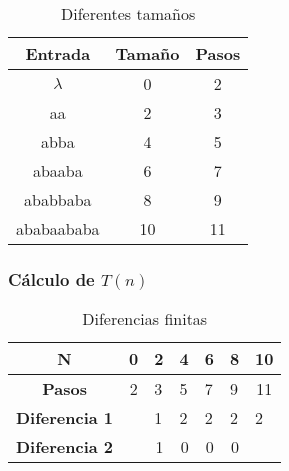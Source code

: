 \documentclass{uc3mpracticas}
\begin{document}
  \begin{table}[!h]
    \centering
  \begin{tabular}{|c|c|c|}
  \hline

  \textbf{Entrada} & \textbf{Tamaño} & \textbf{Pasos} \\ \hline

  $\lambda$           & 0               & 2              \\ \hline
  aa               & 2               & 3              \\ \hline
  abba             & 4               & 5              \\ \hline
  abaaba           & 6               & 7              \\ \hline
  ababbaba         & 8               & 9              \\ \hline
  ababaababa       & 10              & 11             \\ \hline
  \end{tabular}
  \caption{Diferentes tamaños}
  \end{table}



  \subsubsection{Cálculo de $T(n)$}

  \begin{table}[!h]
    \centering
  \begin{tabular}{|c|p{1cm}|p{1cm}|p{1cm}|p{1cm}|p{1cm}|p{1cm}|}
  \hline
  \textbf{N}     & \multicolumn{1}{c|}{\textbf{0}} & \textbf{2} & \textbf{4}             & \textbf{6}             & \textbf{8}             & \multicolumn{1}{c|}{\textbf{10}} \\ \hline
  \textbf{Pasos} & \multicolumn{1}{c|}{2}          & 3          & 5                      & 7                      & 9                      & \multicolumn{1}{c|}{11}          \\ \hline
  \textbf{Diferencia 1}                  &                                                         & \multicolumn{1}{l|}{1}             & \multicolumn{1}{l|}{2} & \multicolumn{1}{l|}{2} & \multicolumn{1}{l|}{2} & 2                                \\ \hline
  \textbf{Diferencia 2}                  &                                                         & \multicolumn{1}{r|}{1}             & \multicolumn{1}{r|}{0} & \multicolumn{1}{r|}{0} & \multicolumn{1}{r|}{0} &                                  \\ \hline
  \end{tabular}
  \caption{Diferencias finitas}
  \end{table}
\end{document}
